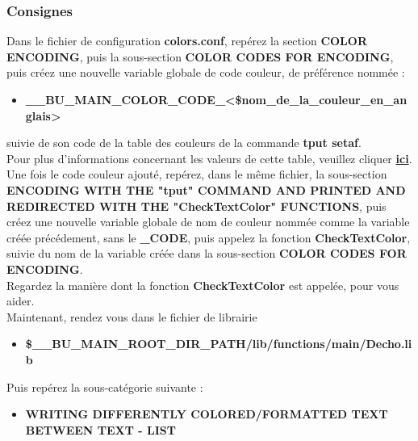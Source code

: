 \documentclass[a4paper,10pt]{article}
\begin{document}
\color{blue}
\subsubsection{Consignes}\color{white}
Dans le fichier de configuration \textbf{\color{lime}colors.conf}, repérez la section \textbf{COLOR ENCODING}, puis la sous-section \textbf{COLOR CODES FOR ENCODING}, puis créez une nouvelle variable globale de code couleur, de préférence nommée :
\begin{itemize}
    \item \textbf{\color{orange}\_\_BU\_MAIN\_COLOR\_CODE\_<\$nom\_de\_la\_couleur\_en\_anglais>}\\[1\baselineskip]
\end{itemize}
 suivie de son code de la table des couleurs de la commande \textbf{\color{gray}tput setaf}.\\[1\baselineskip]

Pour plus d'informations concernant les valeurs de cette table, veuillez cliquer \href{https://unix.stackexchange.com/questions/269077/tput-setaf-color-table-how-to-determine-color-codes/269085#269085}{\textbf{ici}}.\\[1\baselineskip]

Une fois le code couleur ajouté, repérez, dans le même fichier, la sous-section \textbf{ENCODING WITH THE "tput" COMMAND AND PRINTED AND REDIRECTED WITH THE "CheckTextColor" FUNCTIONS}, puis créez une nouvelle variable globale de nom de couleur nommée comme la variable créée précédement, sans le \textbf{\color{orange}\_CODE}, puis appelez la fonction \textbf{\color{mauve}CheckTextColor}, suivie du nom de la variable créée dans la sous-section \textbf{COLOR CODES FOR ENCODING}.\\[1\baselineskip]

Regardez la manière dont la fonction \textbf{\color{mauve}CheckTextColor} est appelée, pour vous aider.\\[1\baselineskip]


Maintenant, rendez vous dans le fichier de librairie
\begin{itemize}
    \item \textbf{\color{orange}\$\_\_BU\_MAIN\_ROOT\_DIR\_PATH\color{lime}/lib/functions/main/Decho.lib}\\[1\baselineskip]
\end{itemize}

Puis repérez la sous-catégorie suivante :
\begin{itemize}
    \item \textbf{WRITING DIFFERENTLY COLORED/FORMATTED TEXT BETWEEN TEXT - LIST}\\[1\baselineskip]
\end{itemize}
\end{document}
